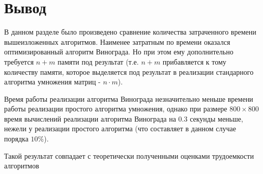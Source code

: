 \newpage
\section{Вывод}
В данном разделе было произведено сравнение количества затраченного вре­мени вышеизложенных алгоритмов.
Наименее затратным по времени оказался оптимизированный алгоритм Винограда. Но при этом ему дополнительно требуется $n+m$ памяти под результат (т.е. $n+m$ прибавляется к тому количеству памяти, которое выделяется под результат в реализации стандарного алгоритма умножения матриц - $n \cdot m$).

Время работы реализации алгоритма Винограда незначительно меньше времени работы реализации простого алгоритма умножения, однако при размере $800 × 800$ время вычислений реализации алгоритма Винограда на 0.3 секунды меньше, нежели у реализации простого алгоритма (что составляет в данном случае порядка $10\%$).

Такой результат совпадает с теоретически полученными оценками трудоемкости алгоритмов 
